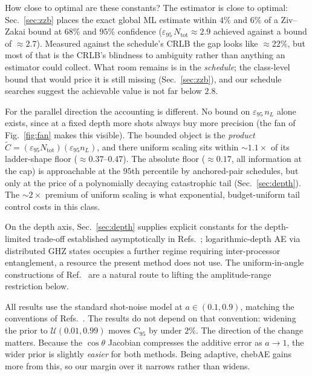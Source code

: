 \documentclass[%
 twocolumn,
 amsmath,amssymb,
prx,
longbibliography
]{revtex4-2}
\newcommand{\Ntot}{N_{\mathrm{tot}}}
\begin{document}
How close to optimal are these constants? The estimator is close to optimal: Sec.~\ref{sec:zzb} places the exact global \ac{ML} estimate within $4\%$ and $6\%$ of a Ziv--Zakai bound at $68\%$ and $95\%$ confidence ($\varepsilon_{95}\, \Ntot \approx 2.9$ achieved against a bound of $\approx 2.7$). Measured against the schedule's \ac{CRLB} the gap looks like $\approx 22\%$, but most of that is the \ac{CRLB}'s blindness to ambiguity rather than anything an estimator could collect. What room remains is in the \emph{schedule}; the class-level bound that would price it is still missing (Sec.~\ref{sec:zzb}), and our schedule searches suggest the achievable value is not far below $2.8$.

For the parallel direction the accounting is different. No bound on $\varepsilon_{95}\, n_L$ alone exists, since at a fixed depth more shots always buy more precision (the fan of Fig.~\ref{fig:fan} makes this visible). The bounded object is the \emph{product} $\widetilde C = (\varepsilon_{95}\Ntot)(\varepsilon_{95} n_L)$, and there uniform scaling sits within $\sim 1.1\times$ of its ladder-shape floor ($\approx 0.37$--$0.47$). The absolute floor ($\approx 0.17$, all information at the cap) is approachable at the $95$th percentile by anchored-pair schedules, but only at the price of a polynomially decaying catastrophic tail (Sec.~\ref{sec:depth}). The $\sim 2\times$ premium of uniform scaling is what exponential, budget-uniform tail control costs in this class.

On the depth axis, Sec.~\ref{sec:depth} supplies explicit constants for the depth-limited trade-off established asymptotically in Refs.~\cite{giurgica2022low, huang2026eigengap, erle2026anydepth}; logarithmic-depth \ac{AE} via distributed GHZ states \cite{oshio2025near} occupies a further regime requiring inter-processor entanglement, a resource the present method does not use. The uniform-in-angle constructions of Ref.~\cite{erle2026anydepth} are a natural route to lifting the amplitude-range restriction below.

All results use the standard shot-noise model at $a \in (0.1, 0.9)$, matching the conventions of Refs.~\cite{suzuki2020amplitude, grinko2021iterative, Rall2023amplitudeestimation, labib2024csae}. The results do not depend on that convention: widening the prior to $\mathcal{U}(0.01, 0.99)$ moves $C_{95}$ by under $2\%$. The direction of the change matters. Because the $\cos\theta$ Jacobian compresses the additive error as $a \to 1$, the wider prior is slightly \emph{easier} for both methods. Being adaptive, chebAE gains more from this, so our margin over it narrows rather than widens.
\end{document}
